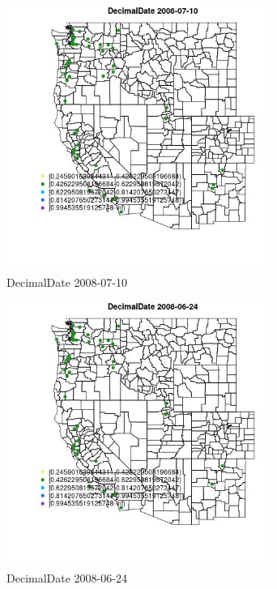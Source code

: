 \begin{figure} 
\centering  
\includegraphics[width=0.77\textwidth]{Code_Outputs/Report_ML_input_PM25_Step4_part_e_de_duplicated_aves_MapObsDecimalDate2008-07-10.jpg} 
\caption{\label{fig:Report_ML_input_PM25_Step4_part_e_de_duplicated_avesMapObsDecimalDate2008-07-10}DecimalDate 2008-07-10} 
\end{figure} 
 

\begin{figure} 
\centering  
\includegraphics[width=0.77\textwidth]{Code_Outputs/Report_ML_input_PM25_Step4_part_e_de_duplicated_aves_MapObsDecimalDate2008-06-24.jpg} 
\caption{\label{fig:Report_ML_input_PM25_Step4_part_e_de_duplicated_avesMapObsDecimalDate2008-06-24}DecimalDate 2008-06-24} 
\end{figure} 
 

